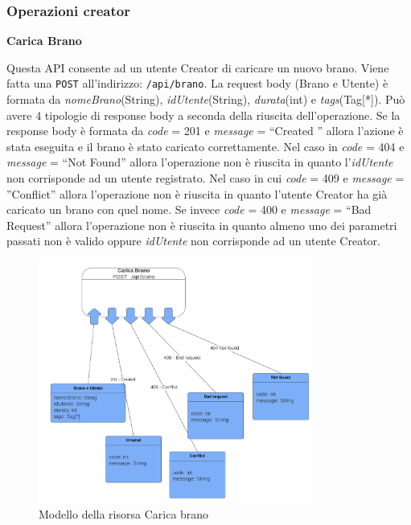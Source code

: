 \documentclass[a4paper,12pt]{article}
\begin{document}
\subsubsection*{Operazioni creator}

\textbf{Carica Brano}

Questa API consente ad un utente Creator di caricare un nuovo brano. Viene fatta una \texttt{POST} all’indirizzo: \texttt{/api/brano}. \newline
La request body (Brano e Utente) è formata da \textit{nomeBrano}(String), \textit{idUtente}(String), \textit{durata}(int) e \textit{tags}(Tag[*]). \newline
Può avere 4 tipologie di response body a seconda della riuscita dell’operazione. \newline
Se la response body è formata da \textit{code} = 201 e \textit{message} = “Created ” allora l'azione è stata eseguita e il brano è stato caricato correttamente. \newline
Nel caso in \textit{code} = 404 e \textit{message} = “Not Found” allora l’operazione non è riuscita in quanto l’\textit{idUtente} non corrisponde ad un utente registrato. \newline
Nel caso in cui \textit{code} = 409  e \textit{message} = ”Conflict” allora l’operazione non è riuscita in quanto l’utente Creator ha già caricato un brano con quel nome. \newline
Se invece \textit{code} = 400 e \textit{message} = “Bad Request” allora l’operazione non è riuscita in quanto almeno uno dei parametri passati non è valido oppure \textit{idUtente} non corrisponde ad un utente Creator.

\begin{figure}[htp]
    \centering
    \includegraphics[width=0.8\textwidth]{resource-models/carica-brano.png}
    \caption{Modello della risorsa Carica brano}
\end{figure}
\end{document}
